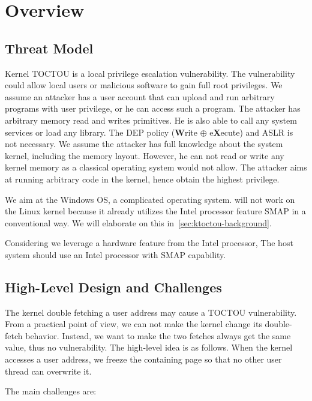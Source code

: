 \section{Overview}
\label{sec:ktoctou-overview}




\subsection{Threat Model}
\label{sec:ktoctou-threatmodel}

Kernel TOCTOU is a local privilege escalation vulnerability. The vulnerability could allow local users or malicious software to gain full root privileges. We assume an attacker has a user account that can upload and run arbitrary programs with user privilege, or he can access such a program. The attacker has arbitrary memory read and writes primitives. He is also able to call any system services or load any library. The DEP policy (\textbf{W}rite $\oplus$ e\textbf{X}ecute) and ASLR is not necessary. We assume the attacker has full knowledge about the system kernel, including the memory layout. However, he can not read or write any kernel memory as a classical operating system would not allow. The attacker aims at running arbitrary code in the kernel, hence obtain the highest privilege.

We aim at the Windows OS, a complicated operating system. \name will not work on the Linux kernel because it already utilizes the Intel processor feature SMAP in a conventional way. We will elaborate on this in~\autoref{sec:ktoctou-background}.


Considering we leverage a hardware feature from the Intel processor, The host system should use an Intel processor with SMAP capability.



\subsection{High-Level Design and Challenges}

The kernel double fetching a user address may cause a TOCTOU vulnerability. From a practical point of view, we can not make the kernel change its double-fetch behavior. Instead, we want to make the two fetches always get the same value, thus no vulnerability. The high-level idea is as follows.  When the kernel accesses a user address, we freeze the containing page so that no other user thread can overwrite it.


The main challenges are:

